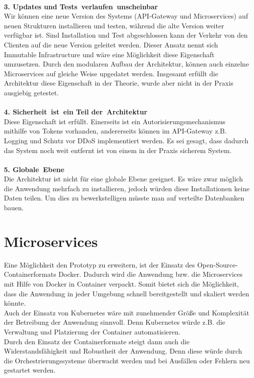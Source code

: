 \\
\textbf{3. Updates und Tests verlaufen unscheinbar}\\
Wir können eine neue Version des Systems (API-Gateway und Microservices) auf neuen Strukturen installieren und testen, während die alte Version weiter verfügbar ist. Sind Installation und Test abgeschlossen kann der Verkehr von den Clienten auf die neue Version geleitet werden. Dieser Ansatz nennt sich Immutable Infrastructure und wäre eine Möglichkeit diese Eigenschaft umzusetzen. Durch den modularen Aufbau der Architektur, können auch einzelne Microservices auf gleiche Weise upgedatet werden. Insgesamt erfüllt die Architektur diese Eigenschaft in der Theorie, wurde aber nicht in der Praxis ausgiebig getestet.\\
\\
\textbf{4. Sicherheit ist ein Teil der Architektur}\\
Diese Eigenschaft ist erfüllt. Einerseits ist ein Autorisierungsmechanismus mithilfe von Tokens vorhanden, andererseits können im API-Gateway z.B. Logging und Schutz vor DDoS implementiert werden. Es sei gesagt, dass dadurch das System noch weit entfernt ist von einem in der Praxis sicherem System.\\
\\
\textbf{5. Globale Ebene}\\
Die Architektur ist nicht für eine globale Ebene geeignet. Es wäre zwar möglich die Anwendung mehrfach zu installieren, jedoch würden diese Installationen keine Daten teilen. Um dies zu bewerkstelligen müsste man auf verteilte Datenbanken bauen.

\section{Microservices}
Eine Möglichkeit den Prototyp zu erweitern, ist der Einsatz des Open-Source-Containerformats Docker. Dadurch wird die Anwendung bzw. die Microservices mit Hilfe von Docker in Container verpackt. Somit bietet sich die Möglichkeit, dass die Anwendung in jeder Umgebung schnell bereitgestellt und skaliert werden könnte.\\
Auch der Einsatz von Kubernetes wäre mit zunehmender Größe und Komplexität der Betreibung der Anwendung sinnvoll. Denn Kubernetes würde z.B. die Verwaltung und Platzierung der Container automatisieren.\\
Durch den Einsatz der Containerformate steigt dann auch die Widerstandsfähigkeit und Robustheit der Anwendung. Denn diese würde durch die Orchestrierungssysteme überwacht werden und bei Ausfällen oder Fehlern neu gestartet werden.
 
